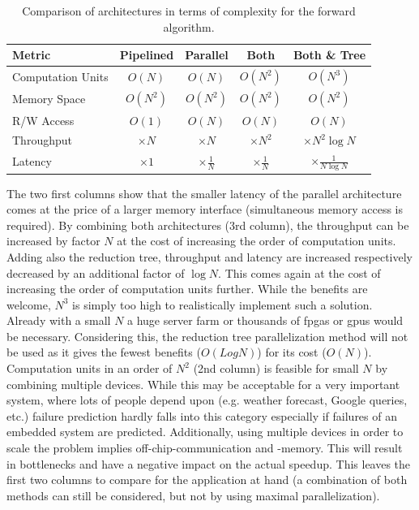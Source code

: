 \documentclass[mscthesis]{usiinfthesis}
\begin{document}
\begin{table}
    \begin{center}
        \begin{tabular}{|l|*{4}{c|}}
            \hline
            Metric & Pipelined & Parallel & Both & Both \& Tree \\
            \hline
            \hline
            Computation Units
            & $O(N)$ & $O(N)$ & $O(N^2)$ & $O(N^3)$ \\
            \hline
            Memory Space
            & $O(N^2)$ & $O(N^2)$ & $O(N^2)$ & $O(N^2)$ \\
            \hline
            R/W Access
            & $O(1)$ & $O(N)$ & $O(N)$ & $O(N)$ \\
            \hline
            \hline
            Throughput
            & $\times N$ & $\times N$ & $\times N^2$ & $\times N^2\log N$ \\
            \hline
            Latency
            & $\times 1$ & $\times \frac{1}{N}$ & $\times \frac{1}{N}$
            & $\times \frac{1}{N\log N}$ \\
            \hline
        \end{tabular}
    \end{center}
    \caption{Comparison of architectures in terms of complexity for the forward
        algorithm.}
    \label{tab:summary_O}
\end{table}

The two first columns show that the smaller latency of the parallel
architecture comes at the price of a larger memory interface (simultaneous
memory access is required). By combining both architectures (3rd column), the
throughput can be increased by factor $N$ at the cost of increasing the order
of computation units. Adding also the reduction tree, throughput and latency
are increased respectively decreased by an additional factor of $\log N$. This
comes again at the cost of increasing the order of computation units further.
While the benefits are welcome, $N^3$ is simply too high to realistically
implement such a solution. Already with a small $N$ a huge server farm or
thousands of \glspl{fpga} or \glspl{gpu} would be necessary. Considering this,
the reduction tree parallelization method will not be used as it gives the
fewest benefits ($O(LogN)$) for its cost ($O(N)$). Computation units in an
order of $N^2$ (2nd column) is feasible for small $N$ by combining multiple
devices. While this may be acceptable for a very important system,  where
lots of people depend upon (e.g. weather forecast, Google queries, etc.)
failure prediction hardly falls into this category especially if failures of an
embedded system are predicted. Additionally, using multiple devices in order
to scale the problem implies off-chip-communication and -memory. This will
result in bottlenecks and have a negative impact on the actual speedup. This
leaves the first two columns to compare for the application at hand (a
combination of both methods can still be considered, but not by using maximal
parallelization).
\end{document}
